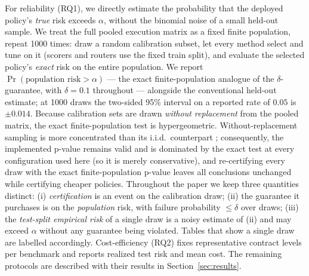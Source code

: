 For reliability (RQ1), we directly estimate the probability that the
deployed policy's \emph{true} risk exceeds $\alpha$, without the
binomial noise of a small held-out
sample. We treat the full pooled execution matrix as a fixed finite
population, repeat 1000 times: draw a random calibration subset, let
every method select and tune on it (scorers and routers use the fixed
train split), and evaluate the selected policy's \emph{exact} risk on
the entire population. We report
$\Pr(\text{population risk} > \alpha)$ --- the exact finite-population
analogue of the $\delta$-guarantee, with $\delta = 0.1$ throughout ---
alongside the conventional held-out estimate; at 1000 draws the
two-sided 95\% interval on a reported rate of $0.05$ is $\pm 0.014$.
Because calibration sets are drawn \emph{without replacement} from the
pooled matrix, the exact finite-population test is hypergeometric.
Without-replacement sampling is more concentrated than its i.i.d.\
counterpart \citep{bardenet2015concentration}; consequently, the
implemented p-value remains valid and is dominated by the exact test
at every configuration used here (so it is merely
conservative), and re-certifying every draw with the exact
finite-population p-value leaves all conclusions unchanged while
certifying cheaper policies.
Throughout the paper we keep three quantities distinct: (i)
\emph{certification} is an event on the calibration draw; (ii) the
guarantee it purchases is on the \emph{population} risk, with failure
probability $\le \delta$ over draws; (iii) the \emph{test-split
empirical risk} of a single draw is a noisy estimate of (ii) and may
exceed $\alpha$ without any guarantee being violated. Tables that show
a single draw are labelled accordingly. Cost-efficiency (RQ2) fixes
representative contract levels per benchmark and reports realized test
risk and mean cost. The remaining protocols are described with their
results in Section~\ref{sec:results}.
